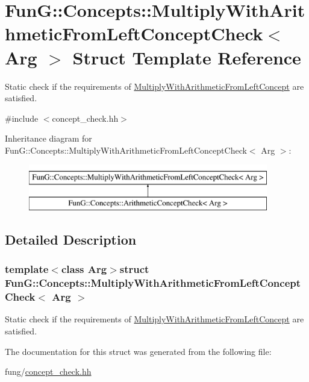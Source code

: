 \hypertarget{structFunG_1_1Concepts_1_1MultiplyWithArithmeticFromLeftConceptCheck}{\section{Fun\-G\-:\-:Concepts\-:\-:Multiply\-With\-Arithmetic\-From\-Left\-Concept\-Check$<$ Arg $>$ Struct Template Reference}
\label{structFunG_1_1Concepts_1_1MultiplyWithArithmeticFromLeftConceptCheck}
}


Static check if the requirements of \hyperlink{structFunG_1_1Concepts_1_1MultiplyWithArithmeticFromLeftConcept}{Multiply\-With\-Arithmetic\-From\-Left\-Concept} are satisfied.  




{\ttfamily \#include $<$concept\-\_\-check.\-hh$>$}

Inheritance diagram for Fun\-G\-:\-:Concepts\-:\-:Multiply\-With\-Arithmetic\-From\-Left\-Concept\-Check$<$ Arg $>$\-:\begin{figure}[H]
\begin{center}
\leavevmode
\includegraphics[height=2.000000cm]{structFunG_1_1Concepts_1_1MultiplyWithArithmeticFromLeftConceptCheck}
\end{center}
\end{figure}


\subsection{Detailed Description}
\subsubsection*{template$<$class Arg$>$struct Fun\-G\-::\-Concepts\-::\-Multiply\-With\-Arithmetic\-From\-Left\-Concept\-Check$<$ Arg $>$}

Static check if the requirements of \hyperlink{structFunG_1_1Concepts_1_1MultiplyWithArithmeticFromLeftConcept}{Multiply\-With\-Arithmetic\-From\-Left\-Concept} are satisfied. 

The documentation for this struct was generated from the following file\-:\begin{DoxyCompactItemize}
\item 
fung/\hyperlink{concept__check_8hh}{concept\-\_\-check.\-hh}\end{DoxyCompactItemize}
